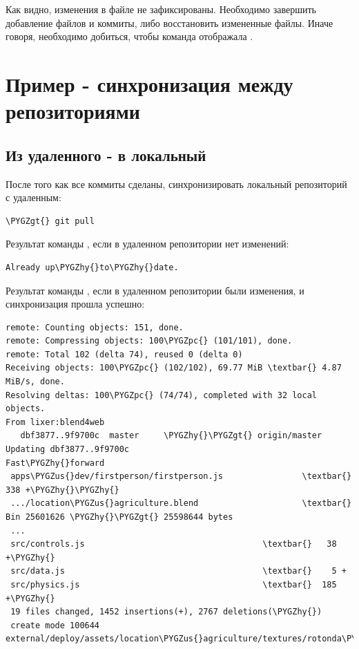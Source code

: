 \documentclass[a4paper,12pt,oneside]{sphinxmanual}
\def\PYGZus{\char`\_}
\def\PYGZgt{\char`\>}
\def\PYGZpc{\char`\%}
\def\PYGZhy{\char`\-}
\begin{document}
Как видно, изменения в файле  не зафиксированы. Необходимо завершить добавление файлов и коммиты, либо восстановить измененные файлы. Иначе говоря, необходимо добиться, чтобы команда  отображала .


\section{Пример - синхронизация между репозиториями}
\label{git_short_manual:index-6}\label{git_short_manual:git-example-repo-sync}\label{git_short_manual:id15}

\subsection{Из удаленного - в локальный}
\label{git_short_manual:id16}
После того как все коммиты сделаны, синхронизировать локальный репозиторий с удаленным:

\begin{Verbatim}[commandchars=\\\{\}]
\PYGZgt{} git pull
\end{Verbatim}

Результат команды , если в удаленном репозитории нет изменений:

\begin{Verbatim}[commandchars=\\\{\}]
Already up\PYGZhy{}to\PYGZhy{}date.
\end{Verbatim}

Результат команды , если в удаленном репозитории были изменения, и синхронизация прошла успешно:

\begin{Verbatim}[commandchars=\\\{\}]
remote: Counting objects: 151, done.
remote: Compressing objects: 100\PYGZpc{} (101/101), done.
remote: Total 102 (delta 74), reused 0 (delta 0)
Receiving objects: 100\PYGZpc{} (102/102), 69.77 MiB \textbar{} 4.87 MiB/s, done.
Resolving deltas: 100\PYGZpc{} (74/74), completed with 32 local objects.
From lixer:blend4web
   dbf3877..9f9700c  master     \PYGZhy{}\PYGZgt{} origin/master
Updating dbf3877..9f9700c
Fast\PYGZhy{}forward
 apps\PYGZus{}dev/firstperson/firstperson.js                \textbar{}  338 +\PYGZhy{}\PYGZhy{}
 .../location\PYGZus{}agriculture.blend                     \textbar{}  Bin 25601626 \PYGZhy{}\PYGZgt{} 25598644 bytes
 ...
 src/controls.js                                    \textbar{}   38 +\PYGZhy{}
 src/data.js                                        \textbar{}    5 +
 src/physics.js                                     \textbar{}  185 +\PYGZhy{}
 19 files changed, 1452 insertions(+), 2767 deletions(\PYGZhy{})
 create mode 100644    external/deploy/assets/location\PYGZus{}agriculture/textures/rotonda\PYGZus{}02\PYGZus{}diff.png
\end{Verbatim}
\end{document}
